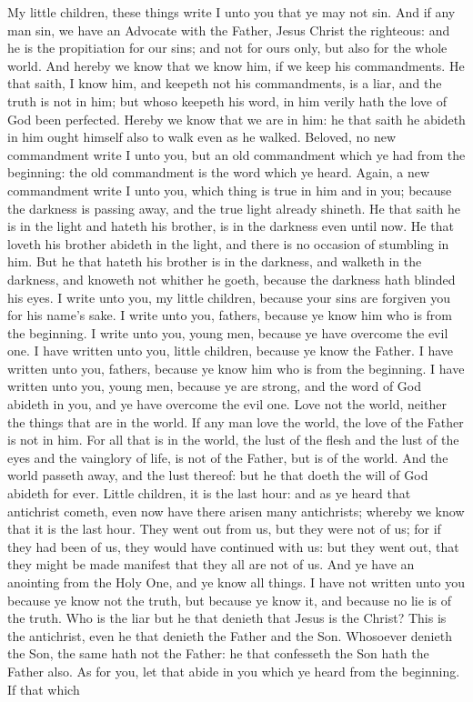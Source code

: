 My little children, these things write I unto you that ye may not sin. And if any man sin, we have an Advocate with the Father, Jesus Christ the righteous: and he is the propitiation for our sins; and not for ours only, but also for the whole world. And hereby we know that we know him, if we keep his commandments. He that saith, I know him, and keepeth not his commandments, is a liar, and the truth is not in him; but whoso keepeth his word, in him verily hath the love of God been perfected. Hereby we know that we are in him: he that saith he abideth in him ought himself also to walk even as he walked.  Beloved, no new commandment write I unto you, but an old commandment which ye had from the beginning: the old commandment is the word which ye heard. Again, a new commandment write I unto you, which thing is true in him and in you; because the darkness is passing away, and the true light already shineth. He that saith he is in the light and hateth his brother, is in the darkness even until now. He that loveth his brother abideth in the light, and there is no occasion of stumbling in him. But he that hateth his brother is in the darkness, and walketh in the darkness, and knoweth not whither he goeth, because the darkness hath blinded his eyes.  I write unto you, my little children, because your sins are forgiven you for his name’s sake. I write unto you, fathers, because ye know him who is from the beginning. I write unto you, young men, because ye have overcome the evil one. I have written unto you, little children, because ye know the Father. I have written unto you, fathers, because ye know him who is from the beginning. I have written unto you, young men, because ye are strong, and the word of God abideth in you, and ye have overcome the evil one. Love not the world, neither the things that are in the world. If any man love the world, the love of the Father is not in him. For all that is in the world, the lust of the flesh and the lust of the eyes and the vainglory of life, is not of the Father, but is of the world. And the world passeth away, and the lust thereof: but he that doeth the will of God abideth for ever.  Little children, it is the last hour: and as ye heard that antichrist cometh, even now have there arisen many antichrists; whereby we know that it is the last hour. They went out from us, but they were not of us; for if they had been of us, they would have continued with us: but they went out, that they might be made manifest that they all are not of us. And ye have an anointing from the Holy One, and ye know all things. I have not written unto you because ye know not the truth, but because ye know it, and because no lie is of the truth. Who is the liar but he that denieth that Jesus is the Christ? This is the antichrist, even he that denieth the Father and the Son. Whosoever denieth the Son, the same hath not the Father: he that confesseth the Son hath the Father also. As for you, let that abide in you which ye heard from the beginning. If that which 